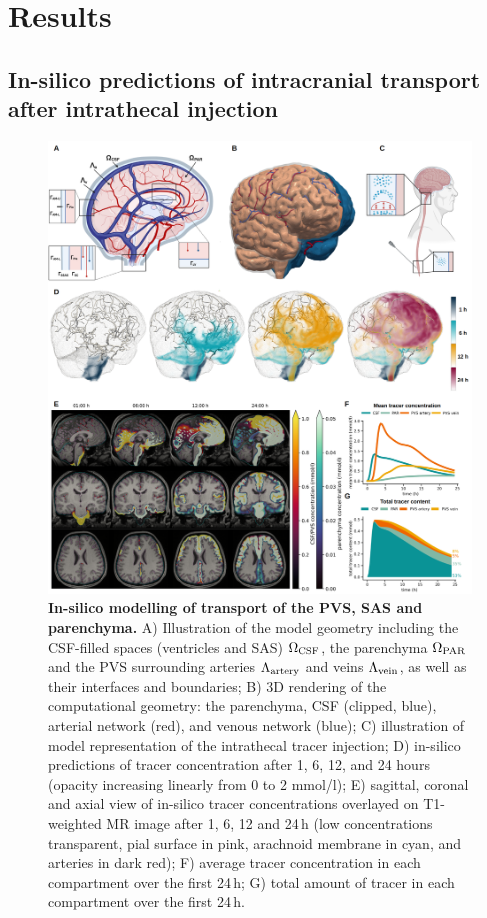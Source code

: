 \documentclass[fleqn,10pt]{wlscirep}
\begin{document}
\section*{Results}

\subsection*{In-silico predictions of intracranial transport after intrathecal injection}
\begin{figure}
    \centering
    \includegraphics[width=1\textwidth]{figures/figure1.png}
     \caption{
     \textbf{In-silico modelling of transport of the PVS, SAS and parenchyma.}
     A) Illustration of the model geometry including the CSF-filled spaces (ventricles and SAS) $\Omega_{\rm CSF}$, the parenchyma $\Omega_{\rm PAR}$ and the PVS surrounding arteries $\Lambda_{\rm artery}$ and veins $\Lambda_{\rm vein}$, as well as their interfaces and boundaries; 
     B) 3D rendering of the computational geometry: the parenchyma, CSF (clipped, blue), arterial network (red), and venous network (blue); 
     C) illustration of model representation of the intrathecal tracer injection; 
     D) in-silico predictions of tracer concentration after 1, 6, 12, and 24 hours (opacity increasing linearly from 0 to 2 mmol/l); 
     E) sagittal, coronal and axial view of in-silico tracer concentrations overlayed on T1-weighted MR image after 1, 6, 12 and 24\,h (low concentrations transparent, pial surface in pink, arachnoid membrane in cyan, and arteries in dark red); 
     F) average tracer concentration in each compartment over the first 24\,h; 
     G) total amount of tracer in each compartment over the first 24\,h.}
     \label{fig:results1}
\end{figure}
\end{document}
